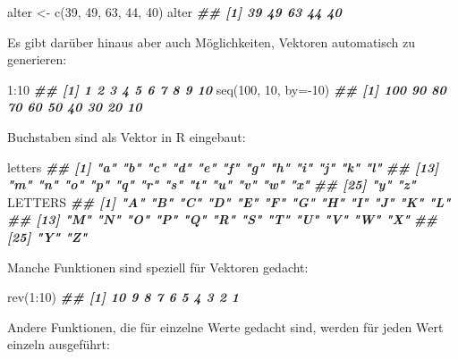 \documentclass[11pt,german,a4paper]{article}
\newenvironment{Shaded}{\begin{snugshade}}{\end{snugshade}}
\newcommand{\AttributeTok}[1]{\textcolor[rgb]{0.77,0.63,0.00}{#1}}
\newcommand{\DecValTok}[1]{\textcolor[rgb]{0.00,0.00,0.81}{#1}}
\newcommand{\DocumentationTok}[1]{\textcolor[rgb]{0.56,0.35,0.01}{\textbf{\textit{#1}}}}
\newcommand{\FunctionTok}[1]{\textcolor[rgb]{0.00,0.00,0.00}{#1}}
\newcommand{\NormalTok}[1]{#1}
\newcommand{\OtherTok}[1]{\textcolor[rgb]{0.56,0.35,0.01}{#1}}
\newcommand{\SpecialCharTok}[1]{\textcolor[rgb]{0.00,0.00,0.00}{#1}}
\begin{document}
\begin{Shaded}
\begin{Highlighting}[]
\NormalTok{alter }\OtherTok{\textless{}{-}} \FunctionTok{c}\NormalTok{(}\DecValTok{39}\NormalTok{, }\DecValTok{49}\NormalTok{, }\DecValTok{63}\NormalTok{, }\DecValTok{44}\NormalTok{, }\DecValTok{40}\NormalTok{)}
\NormalTok{alter}
\DocumentationTok{\#\# [1] 39 49 63 44 40}
\end{Highlighting}
\end{Shaded}

Es gibt darüber hinaus aber auch Möglichkeiten, Vektoren automatisch zu generieren:

\begin{Shaded}
\begin{Highlighting}[]
\DecValTok{1}\SpecialCharTok{:}\DecValTok{10}
\DocumentationTok{\#\#  [1]  1  2  3  4  5  6  7  8  9 10}
\FunctionTok{seq}\NormalTok{(}\DecValTok{100}\NormalTok{, }\DecValTok{10}\NormalTok{, }\AttributeTok{by=}\SpecialCharTok{{-}}\DecValTok{10}\NormalTok{)}
\DocumentationTok{\#\#  [1] 100  90  80  70  60  50  40  30  20  10}
\end{Highlighting}
\end{Shaded}

Buchstaben sind als Vektor in R eingebaut:

\begin{Shaded}
\begin{Highlighting}[]
\NormalTok{letters}
\DocumentationTok{\#\#  [1] "a" "b" "c" "d" "e" "f" "g" "h" "i" "j" "k" "l"}
\DocumentationTok{\#\# [13] "m" "n" "o" "p" "q" "r" "s" "t" "u" "v" "w" "x"}
\DocumentationTok{\#\# [25] "y" "z"}
\NormalTok{LETTERS}
\DocumentationTok{\#\#  [1] "A" "B" "C" "D" "E" "F" "G" "H" "I" "J" "K" "L"}
\DocumentationTok{\#\# [13] "M" "N" "O" "P" "Q" "R" "S" "T" "U" "V" "W" "X"}
\DocumentationTok{\#\# [25] "Y" "Z"}
\end{Highlighting}
\end{Shaded}

Manche Funktionen sind speziell für Vektoren gedacht:

\begin{Shaded}
\begin{Highlighting}[]
\FunctionTok{rev}\NormalTok{(}\DecValTok{1}\SpecialCharTok{:}\DecValTok{10}\NormalTok{)}
\DocumentationTok{\#\#  [1] 10  9  8  7  6  5  4  3  2  1}
\end{Highlighting}
\end{Shaded}

Andere Funktionen, die für einzelne Werte gedacht sind, werden für jeden Wert einzeln ausgeführt:
\end{document}
